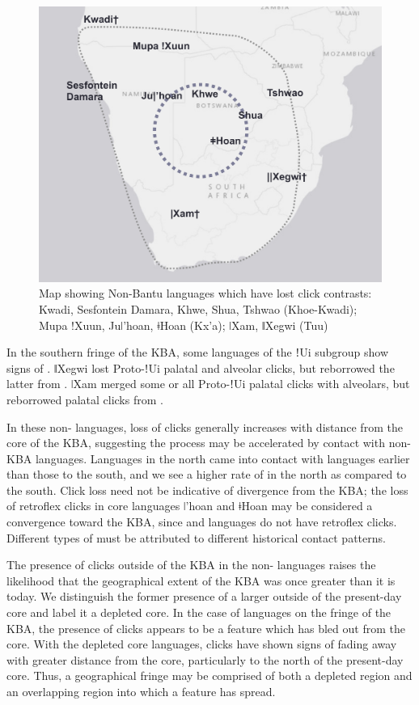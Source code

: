 \documentclass[output=paper
,newtxmath
,modfonts
,nonflat]{langsci/langscibook}
\begin{document}
\begin{figure}
\includegraphics[width=\textwidth]{figures/sands-fig5.png}
\caption{Map showing Non-Bantu languages which have lost click contrasts: Kwadi, Sesfontein Damara, Khwe, Shua, Tshwao (Khoe-Kwadi); Mupa !Xuun, Juǀ'hoan, ǂHoan (Kx'a); ǀXam, ǁXegwi (Tuu)} 
\label{fig:sands:5}
\end{figure}

In the southern fringe of the KBA, some  languages of the ǃUi subgroup show signs of . ǁXegwi lost Proto-ǃUi palatal and alveolar clicks, but reborrowed the latter from  \citep{sands2014, Traill1997}. ǀXam merged some or all Proto-ǃUi palatal clicks with alveolars, but reborrowed palatal clicks from  \citep{sands2014}. 

In these non- languages, loss of clicks generally increases with distance from the core of the KBA, suggesting the process may be accelerated by contact with non-KBA languages. Languages in the north came into contact with  languages earlier than those to the south, and we see a higher rate of  in the north as compared to the south. Click loss need not be indicative of divergence from the KBA; the loss of retroflex clicks in core languages ǀ'hoan and ǂHoan may be considered a convergence toward the KBA, since  and  languages do not have retroflex clicks. Different types of  must be attributed to different historical contact patterns. 

The presence of clicks outside of the KBA in the non- languages raises the likelihood that the geographical extent of the KBA was once greater than it is today. We distinguish the former presence of a larger  outside of the present-day core and label it a depleted core. In the case of  languages on the fringe of the KBA, the presence of clicks appears to be a feature which has bled out from the core. With the depleted core languages, clicks have shown signs of fading away with greater distance from the core, particularly to the north of the present-day core. Thus, a geographical fringe may be comprised of both a depleted region and an overlapping region into which a feature has spread. 
\end{document}
